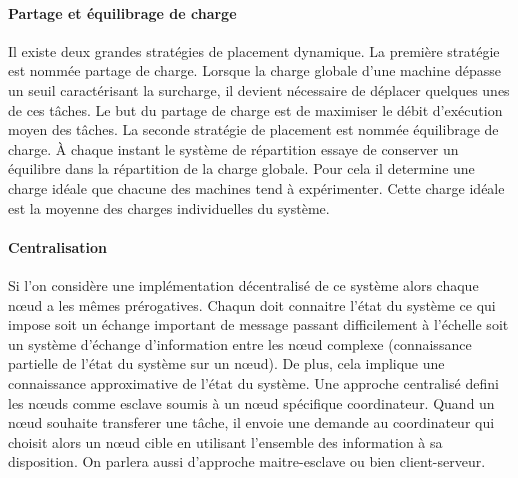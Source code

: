     \paragraph{Partage et équilibrage de charge} Il existe deux grandes
      stratégies de placement dynamique. La première stratégie est
      nommée partage de charge. Lorsque la charge globale d'une
      machine dépasse un seuil caractérisant la surcharge, il devient
      nécessaire de déplacer quelques unes de ces tâches. Le but du
      partage de charge est de maximiser le débit d'exécution moyen
      des tâches. La seconde stratégie de placement est nommée
      équilibrage de charge. À chaque instant le système de
      répartition essaye de conserver un équilibre dans la répartition
      de la charge globale. Pour cela il determine une charge idéale
      que chacune des machines tend à expérimenter. Cette charge
      idéale est la moyenne des charges individuelles du système.



    \paragraph{Centralisation} Si l'on considère une implémentation
      décentralisé de ce système alors chaque n\oe{}ud a les mêmes
      prérogatives. Chaqun doit connaitre l'état du système ce qui
      impose soit un échange important de message passant
      difficilement à l'échelle soit un système d'échange
      d'information entre les n\oe{}ud complexe (connaissance
      partielle de l'état du système sur un n\oe{}ud). De plus, cela
      implique une connaissance approximative de l'état du système.
      Une approche centralisé defini les n\oe{}uds comme esclave
      soumis à un n\oe{}ud spécifique coordinateur. Quand un n\oe{}ud
      souhaite transferer une tâche, il envoie une demande au
      coordinateur qui choisit alors un n\oe{}ud cible en utilisant
      l'ensemble des information à sa disposition. On parlera aussi
      d'approche maitre-esclave ou bien client-serveur.      
      
